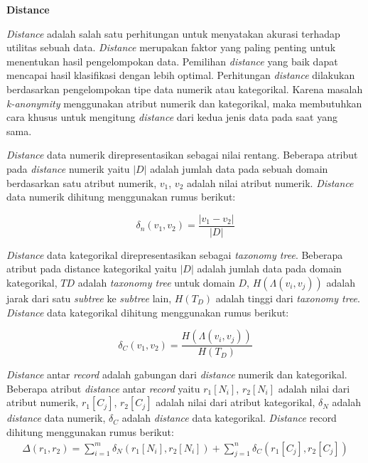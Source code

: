 \documentclass[a4paper,twoside]{article}
\begin{document}
\begin{enumerate}
\textbf{Distance} 

\textit{Distance} adalah salah satu perhitungan untuk menyatakan akurasi terhadap utilitas sebuah data. \textit{Distance} merupakan faktor yang paling penting untuk menentukan hasil pengelompokan data. Pemilihan \textit{distance} yang baik dapat mencapai hasil klasifikasi dengan lebih optimal. Perhitungan \textit{distance} dilakukan berdasarkan pengelompokan tipe data numerik atau kategorikal. Karena masalah \textit{k-anonymity} menggunakan atribut numerik dan kategorikal, maka membutuhkan cara khusus untuk mengitung \textit{distance} dari kedua jenis data pada saat yang sama. 

\textit{Distance} data numerik direpresentasikan sebagai nilai rentang. Beberapa atribut pada \textit{distance} numerik yaitu $|D|$ adalah jumlah data pada sebuah domain berdasarkan satu atribut numerik, $v_1$, $v_2$ adalah nilai atribut numerik. \textit{Distance} data numerik dihitung menggunakan rumus berikut:

\begin{equation}
\delta_n(v_1,v_2) = \frac{|v_1 - v_2|}{|D|} 
\end{equation}

\textit{Distance} data kategorikal direpresentasikan sebagai \textit{taxonomy tree}. Beberapa atribut pada distance kategorikal yaitu $|D|$ adalah jumlah data pada domain kategorikal, $TD$ adalah \textit{taxonomy tree} untuk domain $D$,  $H(\Lambda(v_i,v_j))$ adalah jarak dari satu \textit{subtree} ke \textit{subtree} lain, $H(T_D)$ adalah tinggi dari \textit{taxonomy tree}. \textit{Distance} data kategorikal dihitung menggunakan rumus berikut:

\begin{equation}
\delta_C(v_1,v_2) = \frac{H(\Lambda(v_i,v_j))}{H(T_D)} 
\end{equation}

\textit{Distance} antar \textit{record} adalah gabungan dari \textit{distance} numerik dan kategorikal. Beberapa atribut \textit{distance} antar \textit{record} yaitu $r_1[N_i]$, $r_2[N_i]$ adalah nilai dari atribut numerik, $r_1[C_j]$, $r_2[C_j]$ adalah nilai dari atribut kategorikal, $\delta_N$ adalah \textit{distance} data numerik, $\delta_C$ adalah \textit{distance} data kategorikal. \textit{Distance} record dihitung menggunakan rumus berikut:
\begin{align}
\Delta (r_1,r_2) = \sum_{i=1}^{m} \delta_N(r_1[N_i],r_2	[N_i]) +  \sum_{j=1}^{n} \delta_C(r_1[C_j],r_2[C_j])
\end{align}



\end{enumerate}
\end{document}
